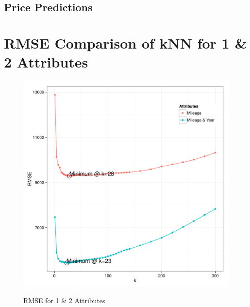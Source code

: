 \documentclass[11pt, fleqn]{article}
\begin{document}
\subsection{Price Predictions}


\section{RMSE Comparison of kNN for 1 \& 2 Attributes}
\begin{figure}[!htb]
  \centering
  \caption{RMSE for 1 \& 2 Attributes}
  \includegraphics[scale=.5]{1p_2p_cv_compare.pdf}
  \label{fig:p_compare}
\end{figure}
\end{document}
